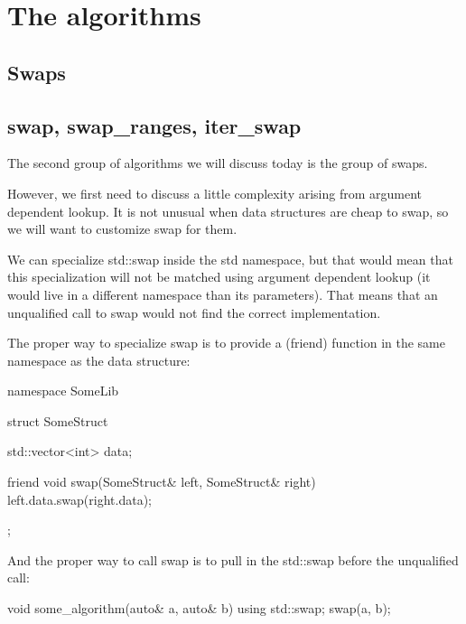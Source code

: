 \chapter{The algorithms}

\section{Swaps}

\section{swap, swap\_ranges, iter\_swap}

The second group of algorithms we will discuss today is the group of swaps.


However, we first need to discuss a little complexity arising from argument dependent lookup. It is not unusual when data structures are cheap to swap, so we will want to customize swap for them.

We can specialize std::swap inside the std namespace, but that would mean that this specialization will not be matched using argument dependent lookup (it would live in a different namespace than its parameters). That means that an unqualified call to swap would not find the correct implementation.

The proper way to specialize swap is to provide a (friend) function in the same namespace as the data structure:

\begin{box-note}
\begin{cppcode}
namespace SomeLib {

struct SomeStruct {
    std::vector<int> data;

    friend void swap(SomeStruct& left, SomeStruct& right) {
        left.data.swap(right.data);
    }
};

}
\end{cppcode}
\end{box-note}

And the proper way to call swap is to pull in the std::swap before the unqualified call:

\begin{box-note}
\begin{cppcode}
void some_algorithm(auto& a, auto& b) {
    using std::swap;
    swap(a, b);
}
\end{cppcode}
\end{box-note}

